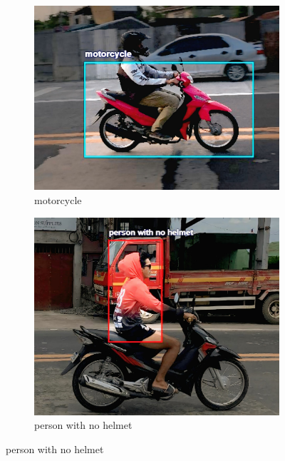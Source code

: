 \begin{refsection}
\begin{figure}[H]
    \centering
    \begin{subfigure}{0.45\textwidth}
        \centering
        \includegraphics[width=\linewidth]{figures/Fig 4a.jpg}
        \caption{motorcycle}
        \label{fig:4a}
    \end{subfigure}
    \hfill
    \begin{subfigure}{0.45\textwidth}
        \centering
        \includegraphics[width=\linewidth]{figures/Fig 4b.jpg}
        \caption{person with no helmet}
        \label{fig:4b}
    \end{subfigure}
    \label{fig:dataset_row1}
\end{figure}


\end{refsection}
